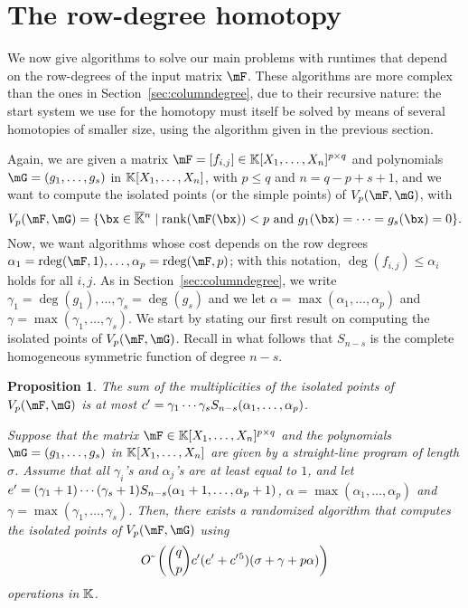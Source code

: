 \documentclass[12pt]{article}
\newtheorem{proposition}[definition]{Proposition}
\begin{document}

\section{The row-degree homotopy}\label{sec:rowdegree}

We now give algorithms to solve our main problems with  runtimes that
depend on the row-degrees of the input matrix $\mF$. These algorithms
are more complex than the ones in Section~\ref{sec:columndegree}, due
to their recursive nature: the start system we use for the homotopy
must itself be solved by means of several homotopies of smaller size,
using the algorithm given in the previous section.

Again, we are given a matrix $\mF =[f_{i,j}]\in \KK[X_1,\dots,X_n]^{p
  \times q}$ and polynomials $\mG=(g_1,\dots,g_s)$ in
$\mathbb{K}[X_1,\dots,X_n]$, with $p \leq q$ and $n = q-p+s+1$, and we want
to compute the isolated points (or the simple points) of
$\VpFG{p}{\mF}{\mG}$, with
$$\VpFG{p}{\mF}{\mG} = \{\bx \in \KKbar{}^n \mid
\mathrm{rank}(\mF({\bx})) < p \text{~and~}
g_1(\bx)=\cdots=g_s(\bx)=0\}.$$ Now, we want algorithms whose cost
depends on the row degrees
$\alpha_1=\rdeg(\mF,1),\dots,\alpha_p=\rdeg(\mF,p)$; with this
notation, $\deg(f_{i,j}) \leq \alpha_i$ holds for all $i,j$. As in
Section~\ref{sec:columndegree}, we write
$\gamma_1=\deg(g_1),\dots,\gamma_s=\deg(g_s)$ and we let $\alpha =
\max(\alpha_1, \ldots, \alpha_p)$ and $\gamma = \max(\gamma_1, \ldots,
\gamma_s)$.  We start by stating our first result on computing the
isolated points of $\VpFG{p}{\mF}{\mG}$. Recall in what follows that
$S_{n-s}$ is the complete homogeneous symmetric function of degree
$n-s$.

\begin{proposition}\label{prop:rowdegree}
  The sum of the multiplicities of the isolated points of
  $\VpFG{p}{\mF}{\mG}$ is at most ${c'}{}=\gamma_1\cdots\gamma_s
  S_{n-s}(\alpha_1, \ldots, \alpha_p)$.
  
  Suppose that the matrix $\mF \in \KK[X_1,\dots,X_n]^{p \times q}$
  and the polynomials $\mG=(g_1,\dots,g_s)$ in $\mathbb{K}[X_1,\dots,X_n]$
  are given by a straight-line program of length $\sigma$.  Assume
  that all $\gamma_i$'s and $\alpha_j$'s are at least equal to $1$,
  and let ${e'}{}=(\gamma_1+1)\cdots(\gamma_s+1) S_{n-s}(\alpha_1+1,
  \ldots, \alpha_p+1)$, $\alpha = \max(\alpha_1, \ldots, \alpha_p)$
  and $\gamma = \max(\gamma_1, \ldots, \gamma_s)$. Then, there exists
  a randomized algorithm that computes the isolated points of
  $\VpFG{p}{\mF}{\mG}$ using
  $${O}{\,\tilde{ }\,}\left( {q \choose p} {c'}{} ({e'}{}+{c'}{}^5 )  (\sigma + \gamma+ p \alpha)  \right)$$
  operations in $\mathbb{K}$.
\end{proposition}
\end{document}
